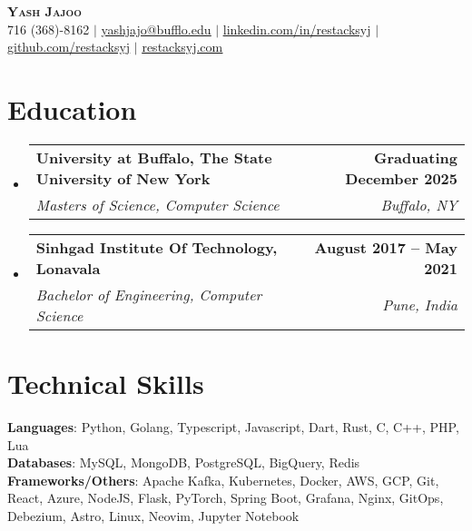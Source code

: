 \documentclass[letterpaper,11pt]{article}
\makeatletter
\newcommand{\resumeSubheading}[4]{
  \vspace{-2pt}\item
    \begin{tabular*}{0.97\textwidth}[t]{l@{\extracolsep{\fill}}r}
        \textbf{#1} & \textbf{#2} \\
      \textit{\small#3} & \textit{\small #4} \\
    \end{tabular*}\vspace{-7pt}
}
\newcommand{\resumeSubHeadingListStart}{\begin{itemize}[leftmargin=0.15in, label={}]}
\newcommand{\resumeSubHeadingListEnd}{\end{itemize}}
\makeatother
\begin{document}

\begin{center}
    \textbf{\Huge \scshape Yash Jajoo} \\ \vspace{1pt}
    \small 716 (368)-8162 $|$ \href{mailto:yashjajo@buffalo.edu}{\underline{yashjajo@bufflo.edu}} $|$ 
    \href{https://linkedin.com/in/restacksyj}{\underline{linkedin.com/in/restacksyj}} $|$
    \href{https://github.com/restacksyj}{\underline{github.com/restacksyj}} $|$
    \href{https://restacksyj.com}{\underline{restacksyj.com}} 
\end{center}


\section{Education}
  \resumeSubHeadingListStart
    \resumeSubheading
      {University at Buffalo, The State University of New York}{Graduating December 2025}
      {Masters of Science, Computer Science}{Buffalo, NY}
    \resumeSubheading
      {Sinhgad Institute Of Technology, Lonavala}{August 2017 -- May 2021}
      {Bachelor of Engineering, Computer Science}{Pune, India}
  \resumeSubHeadingListEnd


\section{Technical Skills}
 \begin{itemize}[leftmargin=0.15in, label={}]
    \small{\item{
            \textbf{Languages}{: Python, Golang, Typescript, Javascript, Dart, Rust, C, C++, PHP, Lua } \\ \textbf{Databases}{: MySQL, MongoDB, PostgreSQL, BigQuery, Redis} \\ \textbf{Frameworks/Others}{: Apache Kafka, Kubernetes, Docker, AWS, GCP, Git, React, Azure, NodeJS, Flask, PyTorch, Spring Boot, Grafana, Nginx, GitOps, Debezium, Astro, Linux, Neovim, Jupyter Notebook }}}
 \end{itemize}
\end{document}

